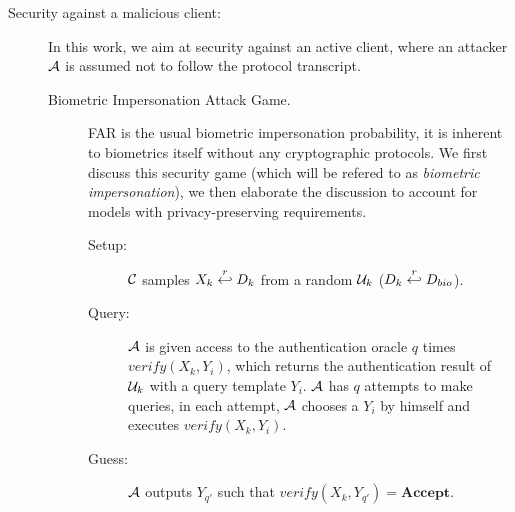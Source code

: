 \begin{description}
\item[Security against a malicious client:] In this work, we aim at security
  against an active client, where an attacker $\mathcal{A}$ is assumed not to
  follow the protocol transcript.
  \begin{description}
  \item[Biometric Impersonation Attack Game.] FAR is the usual biometric
    impersonation probability, it is inherent to biometrics itself without any
    cryptographic protocols. We first discuss this security game (which will be
    refered to as \textit{biometric impersonation}), we then elaborate the
    discussion to account for models with privacy-preserving requirements.
    \begin{description}
    \item[Setup:] $\mathcal{C}$ samples $X_k \stackrel{r}{\hookleftarrow} D_{k}$ from a random
      $\mathcal{U}_k$ ($D_k \stackrel{r}{\hookleftarrow} D_{bio}$).
    \item[Query:] $\mathcal{A}$ is given access to the authentication oracle $q$ times
      $verify(X_k,Y_{i})$, which returns the authentication result of $\mathcal{U}_k$ with
      a query template $Y_{i}$. $\mathcal{A}$ has $q$ attempts to make queries, in
      each attempt, $\mathcal{A}$ chooses a $Y_{i}$ by himself and executes
      $verify(X_k,Y_{i})$.
    \item[Guess:] $\mathcal{A}$ outputs $Y_{q'}$ such that
      $verify(X_k,Y_{q'}) = \textbf{Accept}$.
    \end{description}


\end{description}
\end{description}
